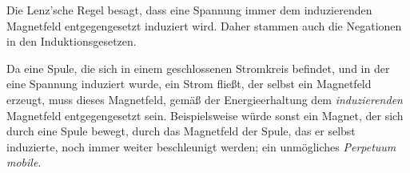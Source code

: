 Die Lenz'sche Regel besagt, dass eine Spannung immer dem induzierenden Magnetfeld entgegengesetzt induziert wird. Daher stammen auch die Negationen in den Induktionsgesetzen.

Da eine Spule, die sich in einem geschlossenen Stromkreis befindet, und in der eine Spannung induziert wurde, ein Strom fließt, der selbst ein Magnetfeld erzeugt, muss dieses Magnetfeld, gemäß der Energieerhaltung dem \emph{induzierenden} Magnetfeld entgegengesetzt sein. Beispielsweise würde sonst ein Magnet, der sich durch eine Spule bewegt, durch das Magnetfeld der Spule, das er selbst induzierte, noch immer weiter beschleunigt werden; ein unmögliches \emph{Perpetuum mobile}.